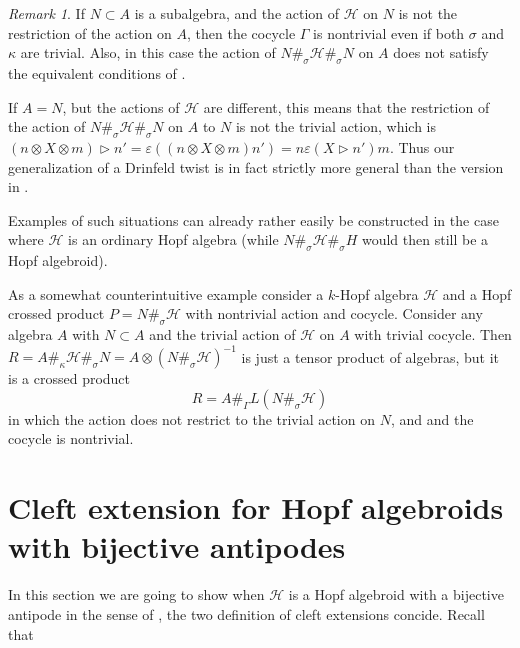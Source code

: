 \documentclass[a4paper,reqno]{amsart}
\numberwithin{equation}{section}
\theoremstyle{plain}
\theoremstyle{remark}
\newtheorem{rem}[thm]{Remark}
\numberwithin{equation}{section}
\newcommand\inv{^{-1}}
\newcommand{\ot}{\otimes}
\newcommand{\la}{{\triangleright}}
\newcommand{\CH}{\mathcal{H}}
\begin{document}
\begin{rem} 
If $N\subset A$ is a subalgebra, and the action of $\CH$ on $N$ is not the restriction of the action on $A$, then the cocycle $\Gamma$ is nontrivial even if both $\sigma$ and $\kappa$ are trivial. Also, in this case the action of  $N\#_\sigma\CH\#_\sigma N$ on $A$ does not satisfy the equivalent conditions of . 

    If $A=N$, but the actions of $\CH$ are different, this means that the restriction of the action of $N\#_\sigma\CH\#_\sigma N$ on $A$ to $N$ is not the trivial action, which is $(n\ot X\ot m)\la n'=\varepsilon((n\ot X\ot m)n')=n\varepsilon(X\la n')m$. Thus our generalization of a Drinfeld twist is in fact strictly more general than the version in \cite{Boehm,HM22,HM23}.

   

    Examples of such situations can already rather easily be constructed in the case where $\CH$ is an ordinary Hopf algebra (while $N\#_\sigma\CH\#_\sigma H$ would then still be a Hopf algebroid). 

    As a somewhat counterintuitive example consider a $k$-Hopf algebra $\CH$ and a Hopf crossed product $P=N\#_\sigma \CH$ with nontrivial action and cocycle. Consider any algebra $A$ with $N\subset A$ and the trivial action of $\CH$ on $A$ with trivial cocycle. Then $R=A\#_\kappa\CH\#_\sigma N=A\ot (N\#_\sigma\CH)\inv$ is just a tensor product of algebras, but it is a crossed product 
    \[R=A\#_\Gamma L(N\#_\sigma\CH)\]
    in which the action does not restrict to the trivial action on $N$, and  and the cocycle is nontrivial.
\end{rem}



\appendix

\section{Cleft extension for  Hopf algebroids with bijective antipodes} In this section we are going to show when $\CH$ is a Hopf algebroid with a bijective antipode in the sense of \cite{BS}, the two definition of cleft extensions concide. Recall that
\end{document}
